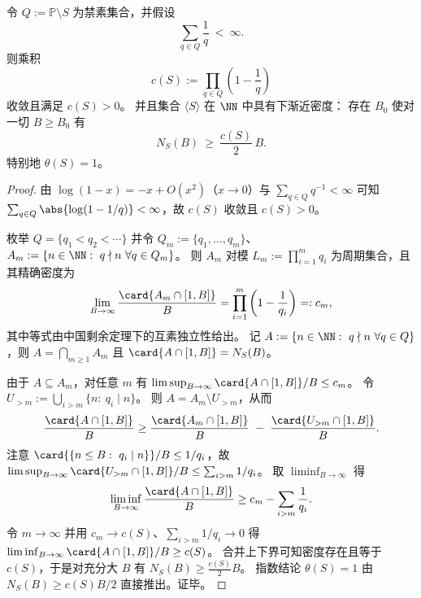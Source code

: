 \begin{proposition}[禁素和收敛蕴含正密度]\label{prop:cdim-denominator-positive-density-thin-forbidden}
令 \(Q:=\mathbb{P}\setminus S\) 为禁素集合，并假设
\[
\sum_{q\in Q}\frac{1}{q}\ <\ \infty.
\]
则乘积
\[
c(S):=\prod_{q\in Q}\left(1-\frac{1}{q}\right)
\]
收敛且满足 \(c(S)>0\)。
并且集合 \(\langle S\rangle\) 在 \(\NN\) 中具有下渐近密度：
存在 \(B_0\) 使对一切 \(B\ge B_0\) 有
\[
N_S(B)\ \ge\ \frac{c(S)}{2}\,B.
\]
特别地 \(\theta(S)=1\)。
\end{proposition}
\begin{proof}
由 \(\log(1-x)=-x+O(x^2)\)（\(x\to 0\)）与 \(\sum_{q\in Q}q^{-1}<\infty\) 可知 \(\sum_{q\in Q}\abs{\log(1-1/q)}<\infty\)，故 \(c(S)\) 收敛且 \(c(S)>0\)。
\par
枚举 \(Q=\{q_1<q_2<\cdots\}\) 并令
\(
Q_m:=\{q_1,\dots,q_m\}
\)、
\(
A_m:=\{n\in\NN:\ q\nmid n\ \forall q\in Q_m\}
\)。
则 \(A_m\) 对模 \(L_m:=\prod_{i=1}^m q_i\) 为周期集合，且其精确密度为
\[
\lim_{B\to\infty}\frac{\card{A_m\cap[1,B]}}{B}
=\prod_{i=1}^m\left(1-\frac{1}{q_i}\right)
=:c_m,
\]
其中等式由中国剩余定理下的互素独立性给出。
记 \(A:=\{n\in\NN:\ q\nmid n\ \forall q\in Q\}\)，则 \(A=\bigcap_{m\ge 1}A_m\) 且 \(\card{A\cap[1,B]}=N_S(B)\)。
\par
由于 \(A\subseteq A_m\)，对任意 \(m\) 有
\(
\limsup_{B\to\infty}\card{A\cap[1,B]}/B\le c_m
\)。
令 \(U_{>m}:=\bigcup_{i>m}\{n:\ q_i\mid n\}\)。
则 \(A=A_m\setminus U_{>m}\)，从而
\[
\frac{\card{A\cap[1,B]}}{B}
\ge
\frac{\card{A_m\cap[1,B]}}{B}
\;-\;
\frac{\card{U_{>m}\cap[1,B]}}{B}.
\]
注意 \(\card{\{n\le B:\ q_i\mid n\}}/B\le 1/q_i\)，故
\(
\limsup_{B\to\infty}\card{U_{>m}\cap[1,B]}/B\le \sum_{i>m}1/q_i
\)。
取 \(\liminf_{B\to\infty}\) 得
\[
\liminf_{B\to\infty}\frac{\card{A\cap[1,B]}}{B}
\ge
c_m-\sum_{i>m}\frac{1}{q_i}.
\]
令 \(m\to\infty\) 并用 \(c_m\to c(S)\)、\(\sum_{i>m}1/q_i\to 0\) 得
\(
\liminf_{B\to\infty}\card{A\cap[1,B]}/B\ge c(S)
\)。
合并上下界可知密度存在且等于 \(c(S)\)，于是对充分大 \(B\) 有 \(N_S(B)\ge \frac{c(S)}{2}B\)。
指数结论 \(\theta(S)=1\) 由 \(N_S(B)\ge c(S)B/2\) 直接推出。证毕。
\end{proof}


